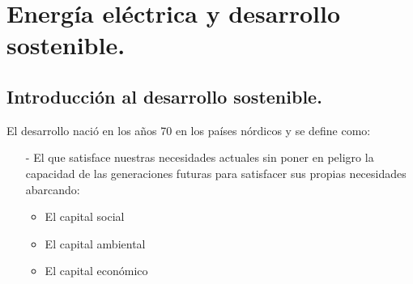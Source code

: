 \chapter{Energía eléctrica y desarrollo sostenible.}
\section{Introducción al desarrollo sostenible.}
El desarrollo nació en los años 70 en los países nórdicos y se define como:
\begin{itemize}
	\item [-] El que satisface
	nuestras necesidades actuales sin poner en peligro la
	capacidad de las generaciones futuras para satisfacer sus
	propias necesidades abarcando:
	\begin{itemize}
		\item El capital social
		\item El capital ambiental
		\item El capital económico
	\end{itemize}
\end{itemize}
